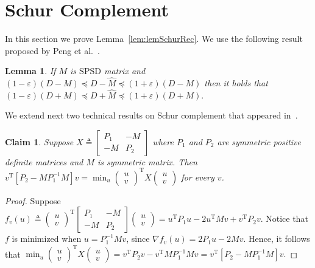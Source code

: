 \documentclass[11pt]{article}
\newcommand{\SPSD}{\mathrm{SPSD}}
\newcommand{\hM}{\widehat{M}}
\newcommand{\rot}{\mathrm{T}}
\newcommand{\eps}{\epsilon}
\newcommand{\lemref}[1]{Lemma~\ref{lem:#1}}
\renewcommand{\eps}{\varepsilon}
\newtheorem{lem}[thm]{Lemma}
\newtheorem{clm}[thm]{Claim}
\numberwithin{thm}{section}
\begin{document}
\section{Schur Complement}\label{appsec:ASC}


In this section we prove \lemref{lemSchurRec}. We use the following result proposed by Peng et al.~\cite{arxivCCLPT15}.

\begin{lem}
\label{lem_DPM}\cite[Lemma 4.3]{arxivCCLPT15} If $M$ is \emph{$\SPSD$}
matrix and $(1-\eps)(D-M)\preceq D-\hM \preceq(1+\eps)(D-M)$
then it holds that $(1-\eps)(D+M)\preceq D+\hM \preceq(1+\eps)(D+M).$
\end{lem}

We extend next two technical results on Schur complement that appeared in~\cite{PengPhd13,MP13,CCLPT15}.


\begin{clm}\label{clm_Schur}
Suppose $X\triangleq\left[\begin{array}{cc}
P_{1} & -M\\
-M & P_{2}
\end{array}\right]$ where $P_{1}$ and $P_{2}$ are symmetric positive definite matrices
and $M$ is symmetric matrix. Then $\,$ $v^{\rot}[P_{2}-MP_{1}^{-1}M]v=\min_{u}\left(\begin{array}{c}
u\\
v
\end{array}\right)^{\rot}X\left(\begin{array}{c}
u\\
v
\end{array}\right)$ for every $v$.
\end{clm}

\begin{proof}
Suppose $f_{v}(u)\triangleq\left(\begin{array}{c}
u\\
v
\end{array}\right)^{\rot}\left[\begin{array}{cc}
P_{1} & -M\\
-M & P_{2}
\end{array}\right]\left(\begin{array}{c}
u\\
v
\end{array}\right)=u^{\rot}P_{1}u-2u^{\rot}Mv+v^{\rot}P_{2}v$. Notice that $f$ is minimized when $u=P_{1}^{-1}Mv$, since $\nabla f_{v}(u)=2P_{1}u-2Mv$.
Hence, it follows that $\min_{u}\left(\begin{array}{c}
u\\
v
\end{array}\right)^{\rot}X\left(\begin{array}{c}
u\\
v
\end{array}\right)=v^{\rot}P_{2}v-v^{\rot}MP_{1}^{-1}Mv=v^{\rot}[P_{2}-MP_{1}^{-1}M]v.$
\end{proof}
\end{document}
